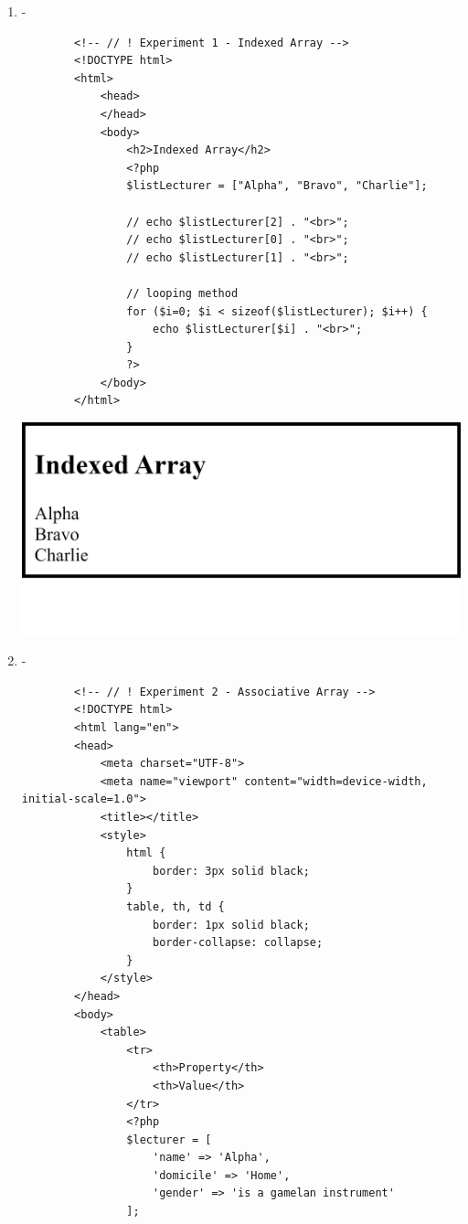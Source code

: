 \documentclass[12pt,titlepage]{article}
\begin{document}
\begin{enumerate}
    \item -
    \begin{verbatim}
        <!-- // ! Experiment 1 - Indexed Array -->
        <!DOCTYPE html>
        <html>
            <head>
            </head>
            <body>
                <h2>Indexed Array</h2>
                <?php
                $listLecturer = ["Alpha", "Bravo", "Charlie"];
        
                // echo $listLecturer[2] . "<br>";
                // echo $listLecturer[0] . "<br>";
                // echo $listLecturer[1] . "<br>";
                
                // looping method
                for ($i=0; $i < sizeof($listLecturer); $i++) { 
                    echo $listLecturer[$i] . "<br>";
                }
                ?>
            </body>
        </html>
    \end{verbatim}
    \includegraphics[width=.9\textwidth]{images/figures/fig1.png}
    
    \newpage
    
    \item -
    \begin{verbatim}        
        <!-- // ! Experiment 2 - Associative Array -->
        <!DOCTYPE html>
        <html lang="en">
        <head>
            <meta charset="UTF-8">
            <meta name="viewport" content="width=device-width, initial-scale=1.0">
            <title></title>
            <style>
                html {
                    border: 3px solid black;
                }
                table, th, td {
                    border: 1px solid black;
                    border-collapse: collapse;
                }
            </style>
        </head>
        <body>
            <table>
                <tr>
                    <th>Property</th>
                    <th>Value</th>
                </tr>
                <?php
                $lecturer = [
                    'name' => 'Alpha',
                    'domicile' => 'Home',
                    'gender' => 'is a gamelan instrument'
                ];


\end{verbatim}
\end{enumerate}
\end{document}
